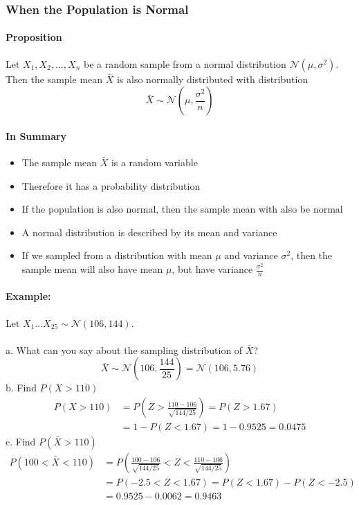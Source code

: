 \subsubsection*{When the Population is Normal}
\paragraph*{Proposition}
Let \(X_1, X_2, \ldots, X_n\) be a random sample from a normal distribution $\mathcal{N}(\mu, \sigma^2)$. Then the sample mean
\(\bar{X}\) is also normally distributed with distribution
\[\bar{X} \sim \mathcal{N}\left(\mu, \frac{\sigma^2}{n}\right)\]

\paragraph*{In Summary}
\begin{itemize}
    \item The sample mean $\bar{X}$ is a random variable
    \item Therefore it has a probability distribution
    \item If the population is also normal, then the sample mean with also be normal
    \item A normal distribution is described by its mean and variance
    \item If we sampled from a distribution with mean $\mu$ and variance $\sigma^2$, then the sample mean will also have mean $\mu$, but have variance $\frac{\sigma^2}{n}$
\end{itemize}

\paragraph*{Example:}
Let $X_1 \dots X_{25} \sim \mathcal{N}(106, 144)$.\\
\\
a. What can you say about the sampling distribution of $\bar{X}$?\\
\[\bar{X} \sim \mathcal{N}\left(106, \frac{144}{25}\right) = \mathcal{N}(106, 5.76)\]
b. Find $P(X > 110)$\\
\begin{align*}
P(X > 110) &= P\left(Z > \frac{110 - 106}{\sqrt{144/25}}\right) = P(Z > 1.67) \\
&= 1 - P(Z < 1.67) = 1 - 0.9525 = 0.0475
\end{align*}
c. Find $P(\bar{X} > 110)$\\
\begin{align*}
P(100 < \bar{X} < 110) &= P\left(\frac{100 - 106}{\sqrt{144/25}} < Z < \frac{110 - 106}{\sqrt{144/25}}\right) \\
&= P(-2.5 < Z < 1.67) = P(Z < 1.67) - P(Z < -2.5) \\
&= 0.9525 - 0.0062 = 0.9463
\end{align*}